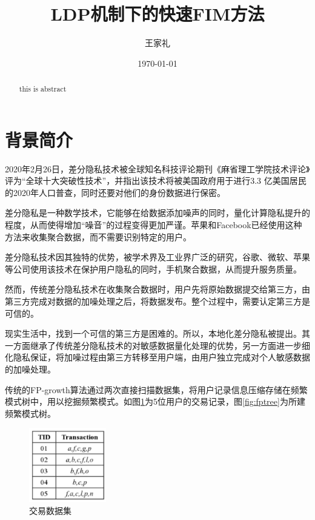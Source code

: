 \documentclass[UTF8]{ctexart}
\title{LDP机制下的快速FIM方法}
\author{王家礼}
\date{\today}
\begin{document}
\maketitle %

\begin{abstract}%
this is abstract
\end{abstract}

\section{背景简介}

2020年2月26日，差分隐私技术被全球知名科技评论期刊《麻省理工学院技术评论》评为“全球十大突破性技术”，并指出该技术将被美国政府用于进行3.3 亿美国居民的2020年人口普查，同时还要对他们的身份数据进行保密。

差分隐私是一种数学技术，它能够在给数据添加噪声的同时，量化计算隐私提升的程度，从而使得增加“噪音”的过程变得更加严谨。苹果和Facebook已经使用这种方法来收集聚合数据，而不需要识别特定的用户。

差分隐私技术因其独特的优势，被学术界及工业界广泛的研究，谷歌、微软、苹果等公司使用该技术在保护用户隐私的同时，手机聚合数据，从而提升服务质量。

然而，传统差分隐私技术在收集聚合数据时，用户先将原始数据提交给第三方，由第三方完成对数据的加噪处理之后，将数据发布。整个过程中，需要认定第三方是可信的。

现实生活中，找到一个可信的第三方是困难的。所以，本地化差分隐私被提出。其一方面继承了传统差分隐私技术的对敏感数据量化处理的优势，另一方面进一步细化隐私保证，将加噪过程由第三方转移至用户端，由用户独立完成对个人敏感数据的加噪处理。

传统的FP-growth算法通过两次直接扫描数据集，将用户记录信息压缩存储在频繁模式树中，用以挖掘频繁模式。如图\ref{fig:DB}为5位用户的交易记录，图\ref{fig:fptree}为所建频繁模式树。

  \begin{figure}[h]
    \centering
    \includegraphics[width=0.3\textwidth]{DB.pdf}
    \caption{交易数据集}
    \label{fig:DB}
  \end{figure}
\end{document}
